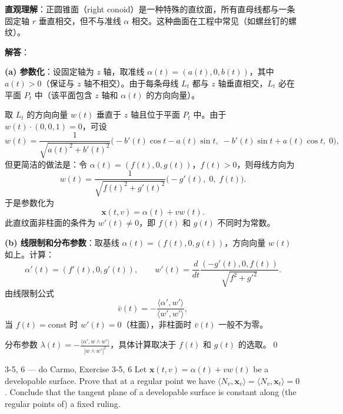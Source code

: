 \begin{solution}
\textbf{直观理解}：正圆锥面（right conoid）是一种特殊的直纹面，所有直母线都与一条固定轴 $r$ 垂直相交，但不与准线 $\alpha$ 相交。这种曲面在工程中常见（如螺丝钉的螺纹）。

\textbf{解答}：

\textbf{(a) 参数化}：设固定轴为 $z$ 轴，取准线 $\alpha(t) = (a(t), 0, b(t))$，其中 $a(t)>0$（保证与 $z$ 轴不相交）。由于每条母线 $L_t$ 都与 $z$ 轴垂直相交，$L_t$ 必在平面 $P_t$ 中（该平面包含 $z$ 轴和 $\alpha(t)$ 的方向向量）。

取 $L_t$ 的方向向量 $w(t)$ 垂直于 $z$ 轴且位于平面 $P_t$ 中。由于 $w(t)\cdot(0,0,1)=0$，可设
\[
w(t) = \frac{1}{\sqrt{a(t)^2+b'(t)^2}}\big(-b'(t)\cos t - a(t)\sin t,\; -b'(t)\sin t + a(t)\cos t,\; 0\big),
\]
但更简洁的做法是：令 $\alpha(t) = (f(t), 0, g(t))$，$f(t)>0$，则母线方向为
\[
w(t) = \frac{1}{\sqrt{f(t)^2+g'(t)^2}}\big(-g'(t),\; 0,\; f(t)\big).
\]
于是参数化为
\[
\mathbf{x}(t,v) = \alpha(t) + v w(t).
\]
此直纹面非柱面的条件为 $w'(t)\neq 0$，即 $f(t)$ 和 $g(t)$ 不同时为常数。

\textbf{(b) 线限制和分布参数}：取基线 $\alpha(t)=(f(t),0,g(t))$，方向向量 $w(t)$ 如上。计算：
\[
\alpha'(t) = (f'(t), 0, g'(t)),\qquad w'(t) = \frac{d}{dt}\frac{(-g'(t), 0, f(t))}{\sqrt{f^2+g'^2}}.
\]
由线限制公式
\[
\bar{v}(t) = -\frac{\langle\alpha', w'\rangle}{\langle w', w'\rangle},
\]
当 $f(t)=\text{const}$ 时 $w'(t)=0$（柱面），非柱面时 $\bar{v}(t)$ 一般不为零。

分布参数 $\lambda(t) = -\frac{\langle\alpha', w\wedge w'\rangle}{|w\wedge w'|^2}$，具体计算取决于 $f(t)$ 和 $g(t)$ 的选取。\qed
\end{solution}

\begin{exercise}{3-5, 6 — do Carmo, Exercise 3-5, 6}
Let $\mathbf{x} (t, v) = \alpha (t) + v w (t)$ be a developable surface. Prove that at a regular point we have $\langle N _ {v}, \mathbf{x} _ {v} \rangle = \langle N _ {v}, \mathbf{x} _ {t} \rangle = 0$. Conclude that the tangent plane of a developable surface is constant along (the regular points of) a fixed ruling.
\end{exercise}

